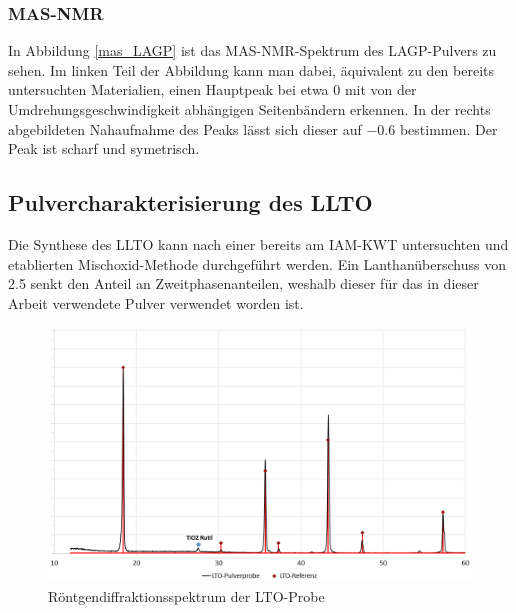 \documentclass[a4paper, 11pt, headsepline,footsepline,twoside,abstract]{scrbook}
\begin{document}
\subsubsection{MAS-NMR}
In Abbildung \ref{mas_LAGP} ist das MAS-NMR-Spektrum des LAGP-Pulvers zu sehen. Im linken Teil der Abbildung kann man dabei, äquivalent zu den bereits untersuchten Materialien, einen Hauptpeak bei etwa \SI{0}{\nmrppm} mit von der Umdrehungsgeschwindigkeit abhängigen Seitenbändern erkennen. In der rechts abgebildeten Nahaufnahme des Peaks lässt sich dieser auf \SI{-0.6}{\nmrppm} bestimmen. Der Peak ist scharf und symetrisch.
\subsection{Pulvercharakterisierung des LLTO}
Die Synthese des LLTO kann nach einer bereits am IAM-KWT untersuchten und etablierten Mischoxid-Methode durchgeführt werden. Ein Lanthanüberschuss von \SI{2.5}{\masspercent} senkt den Anteil an Zweitphasenanteilen, weshalb dieser für das in dieser Arbeit verwendete Pulver verwendet worden ist.
\newpage
\begin{figure}
	\centering
	\includegraphics[width=0.9\columnwidth]{images/XRD_LTO.png}
	\caption{Röntgendiffraktionsspektrum der LTO-Probe}
	\label{xrd_LTO}
\end{figure}
\end{document}
